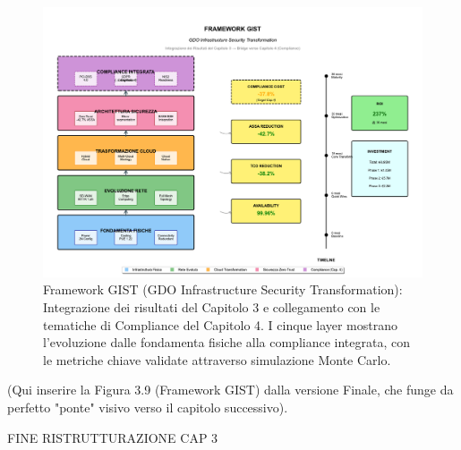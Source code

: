 \begin{figure}[htbp]
\centering
\includegraphics[width=\textwidth]{thesis_figures/cap3/figura_3_6_framework_integrato.pdf}
\caption{Framework GIST (GDO Infrastructure Security Transformation): 
         Integrazione dei risultati del Capitolo 3 e collegamento con 
         le tematiche di Compliance del Capitolo 4. I cinque layer mostrano 
         l'evoluzione dalle fondamenta fisiche alla compliance integrata, 
         con le metriche chiave validate attraverso simulazione Monte Carlo.}
\label{fig:framework_gist}
\end{figure}

(Qui inserire la Figura 3.9 (Framework GIST) dalla versione Finale, che funge da perfetto "ponte" visivo verso il capitolo successivo).

FINE RISTRUTTURAZIONE CAP 3









